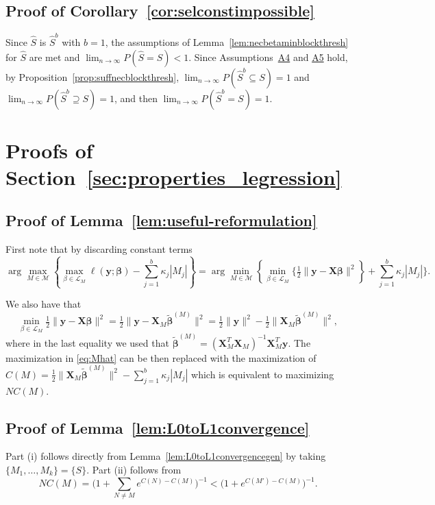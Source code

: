 \documentclass[bj,authoryear]{imsart}
\theoremstyle{plain}
\newcommand{\M}{\mathcal{M}}
\newcommand{\bs}{\boldsymbol}
\begin{document}
\subsection{Proof of Corollary~\ref{cor:selconstimpossible}}
Since $\hat{S}$ is $\hat{S}^b$ with $b=1$, the assumptions of Lemma~\ref{lem:necbetaminblockthresh} for $\hat{S}$ are met and $\lim_{n \to \infty} P(\hat{S} = S) < 1$. Since Assumptions~\hyperlink{lab:A4}{A4} and \hyperlink{lab:A5}{A5} hold, by Proposition~\ref{prop:suffnecblockthresh}, $\lim_{n \to \infty} P(\hat{S}^b \subseteq S)= 1$ and $\lim_{n \to \infty} P(\hat{S}^b \supseteq S)= 1$, and then $\lim_{n \to \infty} P(\hat{S}^b = S)= 1$.\color{black}

\section{Proofs of Section~\ref{sec:properties_legression}}\label{suppsec:proofseclinreg}
\subsection{Proof of Lemma~\ref{lem:useful-reformulation}}
	First note that by discarding constant terms 
 $$\arg\max_{M\in \M} \left\{\max_{\beta\in \mathcal{L}_M}\ell(\bs y; \bs \beta)-\sum_{j=1}^b\kappa_j |M_j| \right\}=\arg\min_{M\in \M} \left\{\min_{\beta\in \mathcal{L}_M}\bigg\{ \tfrac{1}{2}\|\bs y-\bs X\bs\beta\|^2\right\}+\sum_{j=1}^b\kappa_j |M_j| \bigg\}.$$
 
 We also have that 
 $$\min_{\beta\in \mathcal{L}_M} \tfrac{1}{2}\|\bs y-\bs X\bs\beta\|^2=\tfrac{1}{2}\|\bs y-\bs X_{\!\!M}\tilde{\bs \beta}^{(M)}\|^2=\tfrac{1}{2}\|\bs y\|^2-\tfrac{1}{2}\|\bs X_{\!\!M}\tilde{\bs\beta}^{(M)}\|^2,$$
where in the last equality we used that $\tilde{\bs \beta}^{(M)}= (\bs X_M^T \bs X_M)^{-1} \bs X_M^T \bs y$.
 The maximization in \eqref{eq:Mhat} can be then replaced with the maximization of $C(M)=\tfrac{1}{2}
 \|\bs X_{\!\!M}\tilde{\bs\beta}^{(M)}\|^2-\sum_{j=1}^b \kappa_j|M_j|$ which is equivalent to maximizing $NC(M)$.

\subsection{Proof of Lemma~\ref{lem:L0toL1convergence}}
Part (i) follows directly from Lemma~\ref{lem:L0toL1convergencegen} by taking $\{M_1,\ldots,M_k\}=\{S\}$.
Part (ii) follows from
$$NC(M)=\Big(1+\sum_{N \neq M} e^{C(N)-C(M)}\Big)^{-1}
< \big(1+ e^{C(M')-C(M)}\big)^{-1}.$$ 
\end{document}
